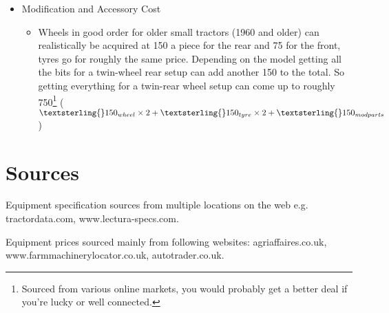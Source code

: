 \documentclass[a4paper,10pt]{article}
\begin{document}
\begin{itemize}
\item Modification and Accessory Cost
  \begin{itemize}
  \item Wheels in good order for older small tractors (1960 and older) can
    realistically be acquired at \textsterling{}150 a piece for the rear and
    \textsterling{}75 for the front, tyres go for roughly the same
    price. Depending on the model getting all the bits for a twin-wheel rear
    setup can add another \textsterling{}150 to the total. So getting
    everything for a twin-rear wheel setup can come up to roughly
    \textsterling{}750\footnote{Sourced from various online markets, you would
      probably get a better deal if you're lucky or well connected.} ($
      \textsterling{}150_{wheel} \times 2 + \textsterling{}150_{tyre} \times 2 +
      \textsterling{}150_{mod parts}$)
  \end{itemize}
\end{itemize}

\section{Sources}
Equipment specification sources from multiple locations on the web
e.g. tractordata.com, www.lectura-specs.com.

Equipment prices sourced mainly from following websites: agriaffaires.co.uk,
www.farmmachinerylocator.co.uk, autotrader.co.uk.
\end{document}
